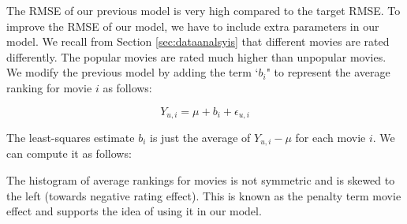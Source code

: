 \documentclass[]{article}
\newenvironment{Shaded}{\begin{snugshade}}{\end{snugshade}}
\newcommand{\CommentTok}[1]{\textcolor[rgb]{0.56,0.35,0.01}{\textit{#1}}}
\newcommand{\DataTypeTok}[1]{\textcolor[rgb]{0.13,0.29,0.53}{#1}}
\newcommand{\DecValTok}[1]{\textcolor[rgb]{0.00,0.00,0.81}{#1}}
\newcommand{\KeywordTok}[1]{\textcolor[rgb]{0.13,0.29,0.53}{\textbf{#1}}}
\newcommand{\NormalTok}[1]{#1}
\newcommand{\OperatorTok}[1]{\textcolor[rgb]{0.81,0.36,0.00}{\textbf{#1}}}
\newcommand{\StringTok}[1]{\textcolor[rgb]{0.31,0.60,0.02}{#1}}
\begin{document}
The RMSE of our previous model is very high compared to the target RMSE.
To improve the RMSE of our model, we have to include extra parameters in
our model. We recall from Section \ref{sec:dataanalsyis} that different
movies are rated differently. The popular movies are rated much higher
than unpopular movies. We modify the previous model by adding the term
`\(b_{i}\)" to represent the average ranking for movie \(i\) as follows:

\begin{equation}
Y_{u, i} = \mu +b_{i}+ \epsilon_{u, i}
\end{equation}

The least-squares estimate \(b_{i}\) is just the average of
\(Y_{u,i} - \mu\) for each movie \(i\). We can compute it as follows:

\begin{Shaded}
\end{Shaded}

The histogram of average rankings for movies is not symmetric and is
skewed to the left (towards negative rating effect). This is known as
the penalty term movie effect and supports the idea of using it in our
model.

\begin{Shaded}
\end{Shaded}
\end{document}
